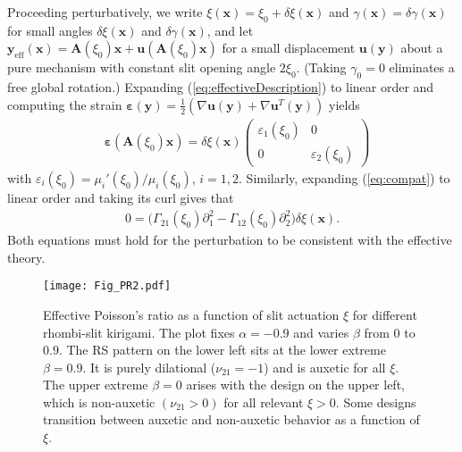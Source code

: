 \documentclass[aps,prl,twocolumn,superscriptaddress]{revtex4-1}
\begin{document}
Proceeding perturbatively, we write $\xi(\mathbf{x})=\xi_0+\delta\xi(\mathbf{x})$ and $\gamma(\mathbf{x})=\delta\gamma(\mathbf{x})$ for small angles $\delta \xi(\mathbf{x})$ and $\delta \gamma (\mathbf{x})$, and let $\mathbf{y}_{\text{eff}}(\mathbf{x}) = \mathbf{A}(\xi_0)\mathbf{x} + \mathbf{u}(\mathbf{A}(\xi_0)\mathbf{x})$ for a small  displacement $\mathbf{u}(\mathbf{y})$ about a pure mechanism with constant slit opening angle $2\xi_0$. 
(Taking $\gamma_0=0$ eliminates a free global rotation.) 
Expanding (\ref{eq:effectiveDescription}) to linear order and computing the strain $\boldsymbol{\varepsilon}(\mathbf{y}) =\tfrac{1}{2} (\nabla \mathbf{u}(\mathbf{y}) + \nabla \mathbf{u}^T(\mathbf{y}))$ yields
\begin{equation}
\begin{aligned}\label{eq:strain}
&\boldsymbol{\varepsilon}(\mathbf{A}(\xi_0)\mathbf{x}) = \delta \xi(\mathbf{x}) \left(\begin{array}{cc} \varepsilon_1(\xi_0) & 0 \\ 0 & \varepsilon_2(\xi_0) \end{array}\right)
\end{aligned}
\end{equation}
with $\varepsilon_i(\xi_0) = \mu_i'(\xi_0)/\mu_i(\xi_0)$, $i=1,2$. Similarly, expanding (\ref{eq:compat}) to linear order and taking its curl gives that
\begin{equation}
    \begin{aligned}\label{eq:linPDE}
    0=\big(\Gamma_{21}(\xi_{0})\partial_{1}^{2} -\Gamma_{12}(\xi_{0})\partial_{2}^{2}\big)\delta\xi(\mathbf{x}).
    \end{aligned}
\end{equation}
Both equations must hold for the  perturbation to be consistent with the effective theory. 

 \begin{figure}
\centering
\texttt{[image: Fig\_PR2.pdf]}
\caption{Effective Poisson's ratio as a function of slit actuation $\xi$ for different rhombi-slit kirigami. The plot fixes $\alpha = -0.9$ and varies $\beta$ from $0$ to $0.9$. The RS pattern on the lower left sits at the lower extreme $\beta = 0.9$. It is purely dilational ($\nu_{21} = -1$) and is auxetic for all $\xi$. The upper extreme $\beta=0$ arises with the design on the upper left, which is non-auxetic $(\nu_{21}>0)$ for all relevant $\xi >0$. Some designs transition between auxetic and non-auxetic behavior as a function of $\xi$.}%
\label{fig:PRatio}
\end{figure}
\end{document}

